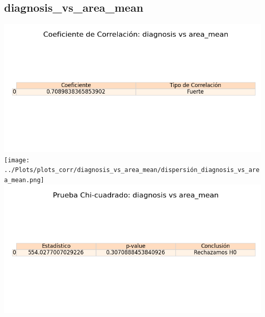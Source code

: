 \documentclass[a4paper, 12pt]{article}
\begin{document}
\subsection{diagnosis\_vs\_area\_mean}
    \includegraphics[width = \textwidth]{../Plots/plots_corr/diagnosis_vs_area_mean/coeficiente_correlacion_diagnosis_vs_area_mean.png}
    \texttt{[image: ../Plots/plots\_corr/diagnosis\_vs\_area\_mean/dispersión\_diagnosis\_vs\_area\_mean.png]}
    \includegraphics[width = \textwidth]{../Plots/plots_corr/diagnosis_vs_area_mean/chi_cuadrado_diagnosis_vs_area_mean.png}
\end{document}
